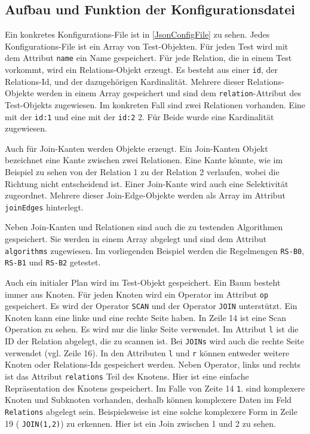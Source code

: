 \subsection{Aufbau und Funktion der Konfigurationsdatei}

Ein konkretes Konfigurations-File ist in \ref{JsonConfigFile} zu sehen. Jedes Konfigurations-File ist ein Array von Test-Objekten. Für jeden Test wird mit dem Attribut \texttt{name} ein Name gespeichert. Für jede Relation, die in einem Test vorkommt, wird ein Relations-Objekt erzeugt. Es besteht aus einer \texttt{id}, der Relations-Id, und der dazugehörigen Kardinalität. Mehrere dieser Relations-Objekte werden in einem Array gespeichert und sind dem \texttt{relation}-Attribut des Test-Objekts zugewiesen. Im konkreten Fall sind zwei Relationen vorhanden. Eine mit der \texttt{id:1} und eine mit der \texttt{id:2} 2. Für Beide wurde eine Kardinalität zugewiesen. 

Auch für Join-Kanten werden Objekte erzeugt. Ein Join-Kanten Objekt bezeichnet eine Kante zwischen zwei Relationen. Eine Kante könnte, wie im Beispiel zu sehen von der Relation 1 zu der Relation 2 verlaufen, wobei die Richtung nicht entscheidend ist. Einer Join-Kante wird auch eine Selektivität zugeordnet. Mehrere dieser Join-Edge-Objekte werden als Array im Attribut \texttt{joinEdges} hinterlegt.

Neben Join-Kanten und Relationen sind auch die zu testenden Algorithmen gespeichert. Sie werden in einem Array abgelegt und sind dem Attribut \texttt{algorithms} zugewiesen. Im vorliegenden Beispiel werden die Regelmengen \texttt{RS-B0}, \texttt{RS-B1} und \texttt{RS-B2} getestet.

Auch ein initialer Plan wird im Test-Objekt gespeichert. Ein Baum besteht immer aus Knoten. Für jeden Knoten wird ein Operator im Attribut \texttt{op} gespeichert. Es wird der Operator \texttt{SCAN} und der Operator \texttt{JOIN} unterstützt. Ein Knoten kann eine linke und eine rechte Seite haben. In Zeile 14 ist eine Scan Operation zu sehen. Es wird nur die linke Seite verwendet. Im Attribut \texttt{l} ist die ID der Relation abgelegt, die zu scannen ist. Bei \texttt{JOINs} wird auch die rechte Seite verwendet (vgl. Zeile 16). In den Attributen \texttt{l} und \texttt{r} können entweder weitere Knoten oder Relations-Ids gespeichert werden. Neben Operator, links und rechts ist das Attribut \texttt{relations} Teil des Knotens. Hier ist eine einfache Repräsentation des Knotens gespeichert. Im Falle von Zeite 14 \texttt{1}. sind komplexere Knoten und Subknoten vorhanden, deshalb  können komplexere Daten im Feld \texttt{Relations} abgelegt sein. Beispielsweise ist eine solche komplexere Form in Zeile 19 ( \texttt{JOIN(1,2)}) zu erkennen. Hier ist ein Join zwischen 1 und 2 zu sehen.

